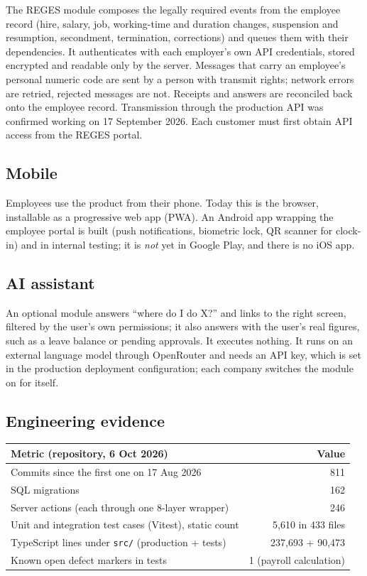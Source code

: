 \documentclass[10pt,a4paper]{article}
\newcommand{\fisier}[1]{\nolinkurl{#1}}
\begin{document}
The REGES module composes the legally required events from the employee record (hire, salary,
job, working-time and duration changes, suspension and resumption, secondment, termination,
corrections) and queues them with their dependencies. It authenticates with each employer's
own API credentials, stored encrypted and readable only by the server. Messages that carry an
employee's personal numeric code are sent by a person with transmit rights; network errors are
retried, rejected messages are not. Receipts and answers are reconciled back onto the employee
record. Transmission through the production API was confirmed working on 17 September 2026.
Each customer must first obtain API access from the REGES portal.

\subsection{Mobile}

Employees use the product from their phone. Today this is the browser, installable as a
progressive web app (PWA). An Android app wrapping the employee portal is built (push
notifications, biometric lock, QR scanner for clock-in) and in internal testing; it is
\emph{not} yet in Google Play, and there is no iOS app.

\subsection{AI assistant}\label{sec:asistent}\nobreak

An optional module answers ``where do I do X?'' and links to the right screen, filtered by the
user's own permissions; it also answers with the user's real figures, such as a leave balance or
pending approvals. It executes nothing. It runs on an external language model through OpenRouter
and needs an API key, which is set in the production deployment configuration; each company
switches the module on for itself.

\subsection{Engineering evidence}

\begin{table}[H]
\centering\small
\begin{tabularx}{\linewidth}{@{}Lr@{}}
\toprule
\textbf{Metric (repository, 6 Oct 2026)} & \textbf{Value} \\
\midrule
Commits since the first one on 17 Aug 2026 & 811 \\
SQL migrations & 162 \\
Server actions (each through one 8-layer wrapper) & 246 \\
Unit and integration test cases (Vitest), static count & 5,610 in 433 files \\
TypeScript lines under \fisier{src/} (production + tests) & 237,693 + 90,473 \\
Known open defect markers in tests & 1 (payroll calculation) \\
\bottomrule
\end{tabularx}
\end{table}
\end{document}

